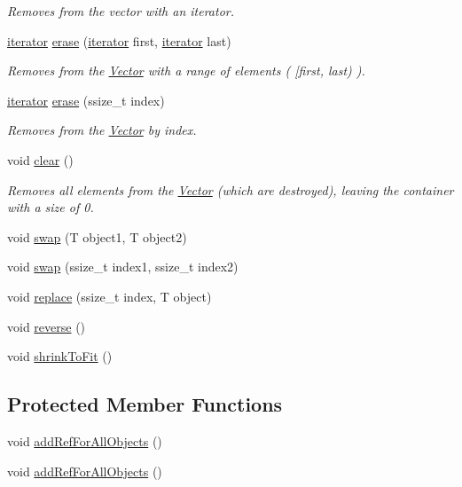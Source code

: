 \begin{DoxyCompactItemize}
\begin{DoxyCompactList}\small\item\em Removes from the vector with an iterator. \end{DoxyCompactList}\item 
\hyperlink{classVector_a45531016f99e90887e0f890f2da943e4}{iterator} \hyperlink{classVector_afd90059f9dff48f4417b51f6eae8e152}{erase} (\hyperlink{classVector_a45531016f99e90887e0f890f2da943e4}{iterator} first, \hyperlink{classVector_a45531016f99e90887e0f890f2da943e4}{iterator} last)
\begin{DoxyCompactList}\small\item\em Removes from the \hyperlink{classVector}{Vector} with a range of elements ( \mbox{[}first, last) ). \end{DoxyCompactList}\item 
\hyperlink{classVector_a45531016f99e90887e0f890f2da943e4}{iterator} \hyperlink{classVector_ab1947437ba829a39c6fd20ada89ec892}{erase} (ssize\+\_\+t index)
\begin{DoxyCompactList}\small\item\em Removes from the \hyperlink{classVector}{Vector} by index. \end{DoxyCompactList}\item 
void \hyperlink{classVector_a32ad98b135472b0ebc5d6cb3ae5d0085}{clear} ()
\begin{DoxyCompactList}\small\item\em Removes all elements from the \hyperlink{classVector}{Vector} (which are destroyed), leaving the container with a size of 0. \end{DoxyCompactList}\item 
void \hyperlink{classVector_a7a46eb16510bb61368d2635d677a9c93}{swap} (T object1, T object2)
\item 
void \hyperlink{classVector_a42d2c65fb958b1cd850881c49c844e18}{swap} (ssize\+\_\+t index1, ssize\+\_\+t index2)
\item 
void \hyperlink{classVector_a3c3ccb39cb5e6f3e56b37f913ada4365}{replace} (ssize\+\_\+t index, T object)
\item 
void \hyperlink{classVector_ab5ab9d731026fcf0001c7252a55923ac}{reverse} ()
\item 
void \hyperlink{classVector_a170ee83bfb8dbfbf9587600012e2bb04}{shrink\+To\+Fit} ()
\end{DoxyCompactItemize}
\subsection*{Protected Member Functions}
\begin{DoxyCompactItemize}
\item 
void \hyperlink{classVector_a76c1c174d6e074ee27e8717ac8e4df1b}{add\+Ref\+For\+All\+Objects} ()
\item 
void \hyperlink{classVector_a76c1c174d6e074ee27e8717ac8e4df1b}{add\+Ref\+For\+All\+Objects} ()
\end{DoxyCompactItemize}
